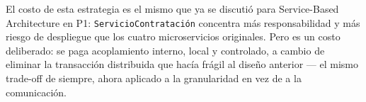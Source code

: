 El costo de esta estrategia es el mismo que ya se discutió para Service-Based
Architecture en P1: \texttt{ServicioContratación} concentra más responsabilidad y
más riesgo de despliegue que los cuatro microservicios originales. Pero es un
costo deliberado: se paga acoplamiento interno, local y controlado, a cambio de
eliminar la transacción distribuida que hacía frágil al diseño anterior --- el
mismo trade-off de siempre, ahora aplicado a la granularidad en vez de a la
comunicación.
